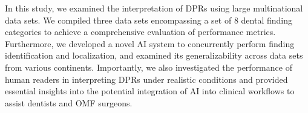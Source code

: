 In this study, we examined the interpretation of DPRs using large multinational data sets.
We compiled three data sets encompassing a set of 8 dental finding categories to achieve a comprehensive evaluation of performance metrics.
Furthermore, we developed a novel AI system to concurrently perform finding identification and localization, and examined its generalizability across data sets from various continents.
Importantly, we also investigated the performance of human readers in interpreting DPRs under realistic conditions and provided essential insights into the potential integration of AI into clinical workflows to assist dentists and OMF surgeons.